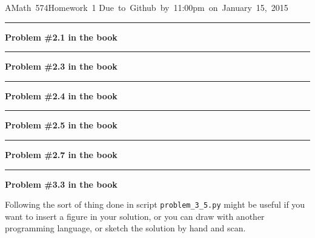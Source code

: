 \documentclass[11pt]{article}
\begin{document}
\hfill\vbox{\hbox{AMath 574}\hbox{Homework 1}
\hbox{Due to Github by 11:00pm on January 15, 2015}}

\vskip 1cm
\hrule
{\bf Problem \#2.1 in the book}





\vskip 1cm
\hrule
{\bf Problem \#2.3 in the book}




\vskip 1cm
\hrule
{\bf Problem \#2.4 in the book}




\vskip 1cm
\hrule
{\bf Problem \#2.5 in the book}




\vskip 1cm
\hrule
{\bf Problem \#2.7 in the book}





\vskip 1cm
\hrule
{\bf Problem \#3.3 in the book}

Following the sort of thing done in 
script \verb+problem_3_5.py+ might be useful if you want to insert a
figure in your solution, or you can draw with another programming language, or
sketch the solution by hand and scan.


\end{document}
